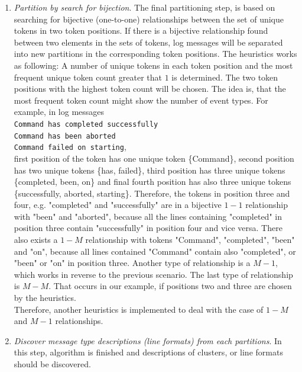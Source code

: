 \begin{enumerate}
        \item \textit{Partition by search for bijection}. The final partitioning step, is based on searching for bijective (one-to-one) relationships between the set of unique tokens in two token positions. If there is a bijective relationship found between two elements in the sets of tokens, log messages will be separated into new partitions in the corresponding token positions. The heuristics works as following: A number of unique tokens in each token position and the most frequent unique token count greater that $1$ is determined. The two token positions with the highest token count will be chosen. The idea is, that the most frequent token count might show the number of event types. For example, in log messages \\
        \texttt{Command has completed successfully} \\
        \texttt{Command has been aborted} \\
        \texttt{Command failed on starting}, \\ 
        first position of the token has one unique token \{Command\}, second position has two unique tokens \{has, failed\}, third position has three unique tokens \{completed, been, on\} and final fourth position has also three unique tokens \{successfully, aborted, starting\}. Therefore, the tokens in position three and four, e.g. "completed" and "successfully" are in a bijective $1-1$ relationship with "been" and "aborted", because all the lines containing "completed" in position three contain "successfully" in position four and vice versa. There also exists a $1-M$ relationship with tokens "Command", "completed", "been" and "on", because all lines contained "Command" contain also "completed", or "been" or "on" in position three. Another type of relationship is a $M-1$, which works in reverse to the previous scenario. The last type of relationship is $M-M$. That occurs in our example, if positions two and three are chosen by the heuristics. \\
        Therefore, another heuristics is implemented to deal with the case of $1-M$ and $M-1$ relationships.
        
        \item \textit{Discover message type descriptions (line formats) from each partitions}. In this step, algorithm is finished and descriptions of clusters, or line formats should be discovered.
    \end{enumerate}

